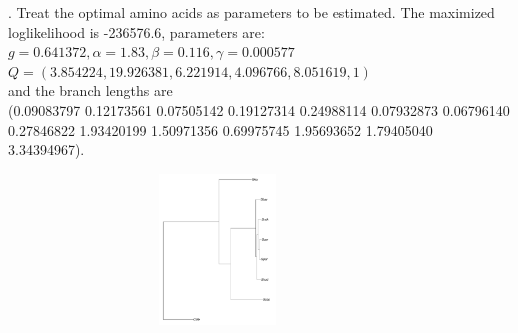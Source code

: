 \documentclass[13pt]{article}
\begin{document}
. Treat the optimal amino acids as parameters to be estimated. The maximized loglikelihood is -236576.6, parameters are: \\
$g=0.641372, \alpha = 1.83, \beta = 0.116, \gamma =  0.000577$\\
 $Q = (3.854224, 19.926381,  6.221914, 4.096766,  8.051619,  1)$\\ 
 and the branch lengths are \\
 (0.09083797 0.12173561 0.07505142 0.19127314 0.24988114 0.07932873 0.06796140 0.27846822 1.93420199 1.50971356 0.69975745 1.95693652
1.79405040 3.34394967).
\begin{figure}[ht]
\center
\includegraphics[width=0.8\textwidth,height=4cm]{besttree.pdf}
\end{figure}
%
%
%
%
%
%
%
%
\end{document}
